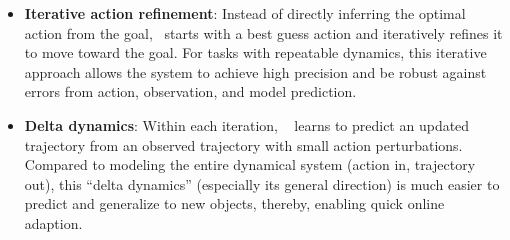 \begin{itemize}[leftmargin=3mm]
\item \textbf{Iterative action refinement}: Instead of directly inferring the optimal action from the goal, \names~starts with a best guess action and iteratively refines it to move toward the goal. For tasks with repeatable dynamics, this iterative approach allows the system to achieve high precision and be robust against errors from action, observation, and model prediction.

\item \textbf{Delta dynamics}: 
Within each iteration, \names~ learns to predict an updated trajectory from an observed trajectory with small action perturbations. Compared to modeling the entire dynamical system (action in, trajectory out), this ``delta dynamics'' (especially its general direction) is much easier to predict and generalize to new objects, thereby, enabling quick online adaption.  





\end{itemize}

